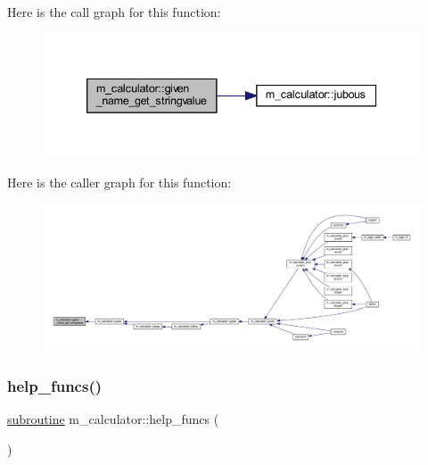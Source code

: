 Here is the call graph for this function\+:
\nopagebreak
\begin{figure}[H]
\begin{center}
\leavevmode
\includegraphics[width=339pt]{namespacem__calculator_a28e87f9e58861836dd6f7dec4bbb9311_cgraph}
\end{center}
\end{figure}
Here is the caller graph for this function\+:
\nopagebreak
\begin{figure}[H]
\begin{center}
\leavevmode
\includegraphics[width=350pt]{namespacem__calculator_a28e87f9e58861836dd6f7dec4bbb9311_icgraph}
\end{center}
\end{figure}
\mbox{\label{namespacem__calculator_a190e152c2fc309d59e75ee4645e6d261}} 
\subsubsection{\texorpdfstring{help\+\_\+funcs()}{help\_funcs()}}
{\footnotesize\ttfamily \hyperlink{M__stopwatch_83_8txt_acfbcff50169d691ff02d4a123ed70482}{subroutine} m\+\_\+calculator\+::help\+\_\+funcs (\begin{DoxyParamCaption}{ }\end{DoxyParamCaption})\hspace{0.3cm}{\ttfamily [private]}}



